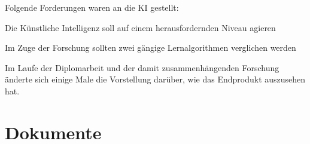 Folgende Forderungen waren an die KI gestellt:
\begin{compactitem}
    \item Die Künstliche Intelligenz soll auf einem herausfordernden Niveau agieren
    \item Im Zuge der Forschung sollten zwei gängige Lernalgorithmen verglichen werden
\end{compactitem}


Im Laufe der Diplomarbeit und der damit zusammenhängenden Forschung änderte sich einige Male die
Vorstellung darüber, wie das Endprodukt auszusehen hat.


\section{Dokumente}
